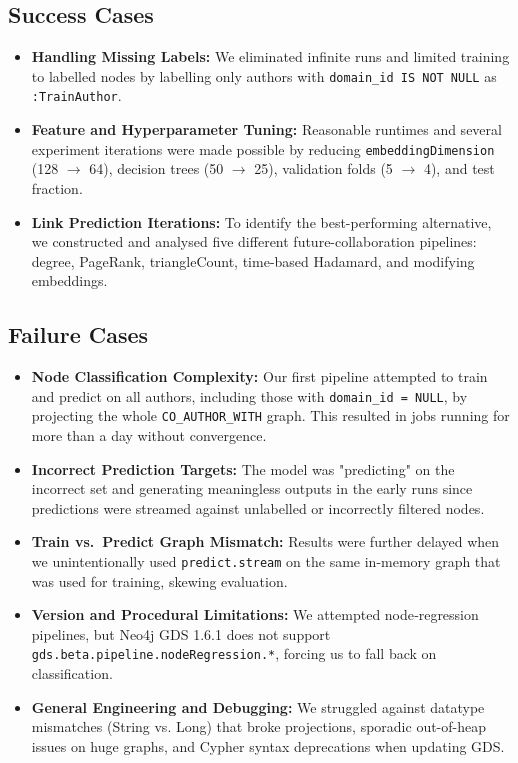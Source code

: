 \documentclass[conference]{IEEEtran}
\begin{document}
\subsection{Success Cases}
\begin{itemize}
  \item \textbf{Handling Missing Labels:}  
    We eliminated infinite runs and limited training to labelled nodes by labelling only authors with \texttt{domain\_id IS NOT NULL} as \texttt{:TrainAuthor}.
  \item \textbf{Feature and Hyperparameter Tuning:}  
    Reasonable runtimes and several experiment iterations were made possible by reducing \texttt{embeddingDimension} (128 \(\to\) 64), decision trees (50 \(\to\) 25), validation folds (5 \(\to\) 4), and test fraction.
  \item \textbf{Link Prediction Iterations:}  
    To identify the best-performing alternative, we constructed and analysed five different future-collaboration pipelines: degree, PageRank, triangleCount, time-based Hadamard, and modifying embeddings.
\end{itemize}

\subsection{Failure Cases}
\begin{itemize}
  \item \textbf{Node Classification Complexity:}  
    Our first pipeline attempted to train and predict on all authors, including those with \texttt{domain\_id = NULL}, by projecting the whole \texttt{CO\_AUTHOR\_WITH} graph. This resulted in jobs running for more than a day without convergence.
  \item \textbf{Incorrect Prediction Targets:}  
    The model was "predicting" on the incorrect set and generating meaningless outputs in the early runs since predictions were streamed against unlabelled or incorrectly filtered nodes.
  \item \textbf{Train vs.\ Predict Graph Mismatch:}  
    Results were further delayed when we unintentionally used \texttt{predict.stream} on the same in-memory graph that was used for training, skewing evaluation.
  \item \textbf{Version and Procedural Limitations:}  
    We attempted node‐regression pipelines, but Neo4j GDS 1.6.1 does not support \texttt{gds.beta.pipeline.nodeRegression.*}, forcing us to fall back on classification.
  \item \textbf{General Engineering and Debugging:}  
    We struggled against datatype mismatches (String vs. Long) that broke projections, sporadic out-of-heap issues on huge graphs, and Cypher syntax deprecations when updating GDS.
\end{itemize}
\end{document}
